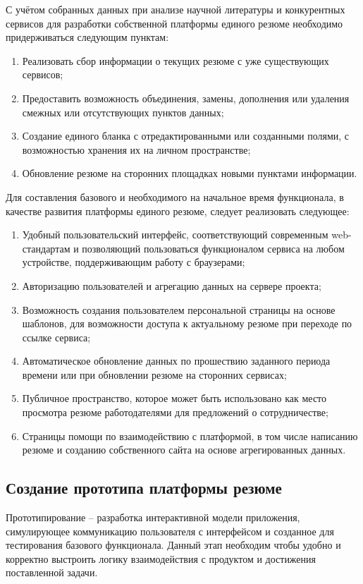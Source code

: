 \documentclass[master, och, diploma]{SCWorks}
\begin{document}
С учётом собранных данных при анализе научной литературы и конкурентных сервисов для разработки собственной платформы единого резюме необходимо придерживаться следующим пунктам:
\begin{enumerate}
    \item Реализовать сбор информации о текущих резюме с уже существующих сервисов;
    \item Предоставить возможность объединения, замены, дополнения или удаления 
    смежных или отсутствующих пунктов данных;
    \item Создание единого бланка с отредактированными или созданными полями, 
    с возможностью хранения их на личном пространстве;
    \item Обновление резюме на сторонних площадках новыми пунктами информации.
\end{enumerate}

Для составления базового и необходимого на начальное время функционала, в качестве развития платформы единого резюме, следует реализовать следующее:
\begin{enumerate}
    \item Удобный пользовательский интерфейс, соответствующий современным web-стандартам 
    и позволяющий пользоваться функционалом сервиса на любом устройстве, поддерживающим 
    работу с браузерами;
    \item Авторизацию пользователей и агрегацию данных на сервере проекта;
    \item Возможность создания пользователем персональной страницы на основе шаблонов, 
    для возможности доступа к актуальному резюме при переходе по ссылке сервиса;
    \item Автоматическое обновление данных по прошествию заданного периода времени или 
    при обновлении резюме на сторонних сервисах;
    \item Публичное пространство, которое может быть использовано как место просмотра 
    резюме работодателями для предложений о сотрудничестве;
    \item Страницы помощи по взаимодействию с платформой, в том числе написанию резюме 
    и созданию собственного сайта на основе агрегированных данных.
\end{enumerate}


\subsection{Создание прототипа платформы резюме}
Прототипирование – разработка интерактивной модели приложения, симулирующее коммуникацию пользователя с интерфейсом и созданное для тестирования базового функционала. Данный этап необходим чтобы удобно и корректно выстроить логику взаимодействия с продуктом и достижения поставленной задачи.
\end{document}
